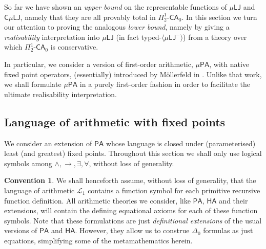 \documentclass[10pt,a4paper]{amsart}
\theoremstyle{plain}
\theoremstyle{definition}
\newtheorem{convention}[convention]{Convention}
\renewcommand{\phi}{\varphi}
\newcommand{\oldtodo}[1]{\todo{#1}} %
\renewcommand{\todo}[1]{}
\theoremstyle{plain}
\theoremstyle{definition} %
\newcommand{\closure}[1]{\langle #1 \rangle}
\newcommand{\LJ}{\mathsf{LJ}}
\newcommand{\muLJ}{\mu\LJ}
\newcommand{\muLJneg}{\muLJ^-}
\newcommand{\circular}{\mathsf C}
\newcommand{\cmuLJ}{\circular\muLJ}
\renewcommand{\land}{\wedge}
\newcommand{\limp}{\to}
\newcommand{\mufo}[3]{\mu #1 \lambda #2 #3}
\newcommand{\Lang}{\mathcal L}
\newcommand{\lang}[1]{\Lang_{#1}}
\newcommand{\langarith}{\lang 1}
\newcommand{\langmuarith}{\lang \mu}
\newcommand{\Pin}[2]{\Pi^{#1}_{#2}}
\newcommand{\PA}{\mathsf{PA}}
\newcommand{\HA}{\mathsf{HA}}
\newcommand{\muPA}{\mu\PA}
\newcommand{\CA}{\mathsf{CA}}
\newcommand{\ca}[1]{#1\text{-}\CA}
\newcommand{\PSCA}{\ca{\Pin 1 2 }_0}
\begin{document}
So far we have shown an \emph{upper bound} on the representable functions of $\muLJ$ and $\cmuLJ$, namely that they are all provably total in $\PSCA$. 
In this section we turn our attention to proving the analogous \emph{lower bound}, namely by giving a \emph{realisability} interpretation into $\muLJ$ (in fact typed-$\closure \muLJneg$) from a theory over which $\PSCA$ is conservative.


In particular, we consider a version of first-order arithmetic, $\muPA$, with native fixed point operators, (essentially) introduced by M\"ollerfeld in \cite{Moellerfeld02:phd-thesis}.
Unlike that work, we shall formulate $\muPA$ in a purely first-order fashion in order to facilitate the ultimate realisability interpretation.







\subsection{Language of arithmetic with fixed points}
We consider an extension of $\PA$ whose language is closed under (parameterised) least (and greatest) fixed points.
Throughout this section we shall only use logical symbols among $\land, \limp, \exists , \forall$, without loss of generality.

\begin{convention}
\label{conv:langarith-has-all-pr-symbols}
We shall henceforth assume, without loss of generality, that the language of arithmetic $\langarith$ contains a function symbol for each primitive recursive function definition.
All arithmetic theories we consider, like $\PA$, $\HA$ and their extensions, will contain the defining equational axioms for each of these function symbols.
Note that these formulations are just \emph{definitional extensions} of the usual versions of $\PA$ and $\HA$.
However, they allow us to construe $\Delta_0$ formulas as just equations, simplifying some of the metamathematics herein.
\end{convention}
\end{document}
